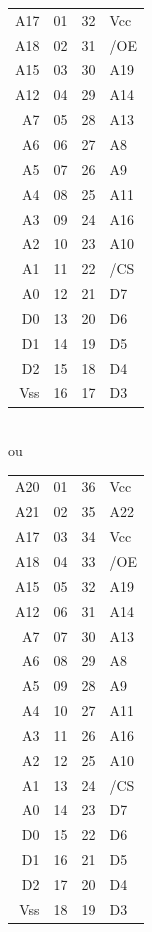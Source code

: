 \documentclass[paper=a4, fontsize=11pt]{scrartcl}	%
\numberwithin{equation}{section}															%
\numberwithin{figure}{section}																%
\numberwithin{table}{section}																%
\begin{document}
\begin{tabular}{rlrl}
               A17 &  01   &      32  & Vcc\\
               A18 &  02   &      31  & /OE\\
               A15 &  03   &      30  & A19\\
               A12 &  04   &      29  & A14\\
                A7 &  05   &      28  & A13\\
                A6 &  06   &      27  & A8\\
                A5 &  07   &      26  & A9\\
                A4 &  08   &      25  & A11\\
                A3 &  09   &      24  & A16\\
                A2 &  10   &      23  & A10\\
                A1 &  11   &      22  & /CS\\
                A0 &  12   &      21  & D7\\
                D0 &  13   &      20  & D6\\
                D1 &  14   &      19  & D5\\
                D2 &  15   &      18  & D4\\
               Vss &  16   &      17  & D3\\

\end{tabular}\\
ou\\

\begin{tabular}{rlrl}
               A20  & 01     &    36  & Vcc\\
               A21  & 02     &    35  & A22\\
               A17  & 03     &    34  & Vcc\\
               A18  & 04     &    33  & /OE\\
               A15  & 05     &    32  & A19\\
               A12  & 06     &    31  & A14\\
                A7  & 07     &    30  & A13\\
                A6  & 08     &    29  & A8\\
                A5  & 09     &    28  & A9\\
                A4  & 10     &    27  & A11\\
                A3  & 11     &    26  & A16\\
                A2  & 12     &    25  & A10\\
                A1  & 13     &    24  & /CS\\
                A0  & 14     &    23  & D7\\
                D0  & 15     &    22  & D6\\
                D1  & 16     &    21  & D5\\
                D2  & 17     &    20 &  D4\\
               Vss  & 18     &    19 &  D3\\
\end{tabular}
\end{document}
